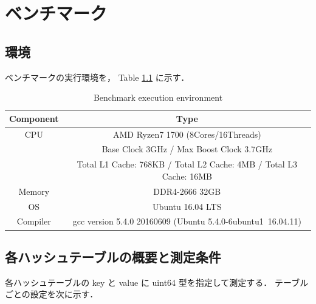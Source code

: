 \chapter{ベンチマーク}
\label{chap_Results}

\section{環境}

ベンチマークの実行環境を，
Table \ref{table_env} に示す．

\begin{table}[hbtp]
  \begin{center}
    \fontsize{9pt}{10pt}\selectfont
    \caption{Benchmark execution environment}
    \begin{tabular}{cc} \hline
      Component & Type                                                               \rule[0pt]{0pt}{10pt} \\ \hline
      CPU       & AMD Ryzen7 1700 (8Cores/16Threads)                                 \rule[0pt]{0pt}{10pt} \\ 
                & Base Clock 3GHz / Max Boost Clock 3.7GHz                           \rule[0pt]{0pt}{10pt} \\
                & Total L1 Cache: 768KB / Total L2 Cache: 4MB / Total L3 Cache: 16MB \rule[0pt]{0pt}{10pt} \\
      Memory    & DDR4-2666 32GB                                                     \rule[0pt]{0pt}{10pt} \\
      OS        & Ubuntu 16.04 LTS                                                   \rule[0pt]{0pt}{10pt} \\
      Compiler  & gcc version 5.4.0 20160609 (Ubuntu 5.4.0-6ubuntu1~16.04.11)        \rule[0pt]{0pt}{10pt} \\ \hline
    \end{tabular}
    \label{table_env}
  \end{center}
\end{table}


\section{各ハッシュテーブルの概要と測定条件}
各ハッシュテーブルの key と value に uint64 型を指定して測定する．
テーブルごとの設定を次に示す．
\leavevmode \newline

